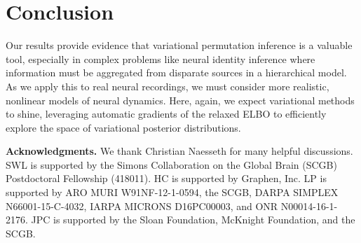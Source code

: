 \documentclass[twoside]{article}
\begin{document}
\section{Conclusion}

Our results provide evidence that variational permutation
inference is a valuable tool, especially in complex
problems like neural identity inference where information must be
aggregated from disparate sources in a hierarchical model.  As we
apply this to real neural recordings, we must consider more realistic,
nonlinear models of neural dynamics. Here, again, we expect
variational methods to shine, leveraging automatic gradients of the
relaxed ELBO to efficiently explore the space of variational posterior
distributions.

{\small
\textbf{Acknowledgments.}
We thank Christian Naesseth for many helpful discussions.  SWL is
supported by the Simons Collaboration on the Global Brain (SCGB)
Postdoctoral Fellowship (418011).
HC is supported by Graphen, Inc.
LP is supported by ARO MURI
W91NF-12-1-0594, the SCGB, DARPA SIMPLEX N66001-15-C-4032, IARPA
MICRONS D16PC00003, and ONR N00014-16-1-2176.  JPC is supported by the
Sloan Foundation, McKnight Foundation, and the SCGB.
}





\clearpage
\appendix


\end{document}
